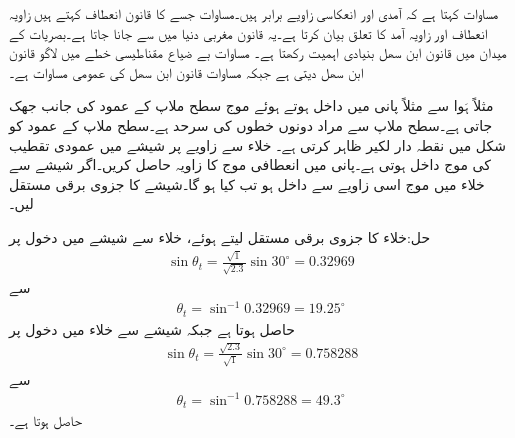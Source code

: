 مساوات  کہتا ہے کہ آمدی اور انعکاسی زاویے برابر ہیں۔مساوات  جسے  کا قانون انعطاف  کہتے ہیں زاویہ انعطاف اور زاویہ آمد کا تعلق بیان کرتا ہے۔یہ قانون مغربی دنیا میں  سے جانا جاتا ہے۔بصریات کے میدان میں قانون ابن سھل بنیادی اہمیت رکھتا ہے۔ مساوات  بے ضیاع مقناطیسی خطے میں لاگو قانون ابن سھل دیتی ہے جبکہ مساوات  قانون ابن سھل کی عمومی مساوات ہے۔

 مثلاً ہَوا سے  مثلاً پانی میں داخل ہوتے ہوئے موج سطح ملاپ کے عمود کی جانب جھک جاتی ہے۔سطح ملاپ سے مراد دونوں خطوں کی سرحد ہے۔سطح ملاپ کے عمود کو شکل  میں نقطہ دار لکیر ظاہر کرتی ہے۔
خلاء سے  زاویے پر شیشے میں عمودی تقطیب کی موج داخل ہوتی ہے۔پانی میں انعطافی موج کا زاویہ  حاصل کریں۔اگر شیشے سے خلاء میں موج اسی زاویے سے داخل ہو تب  کیا ہو گا۔شیشے کا جزوی برقی مستقل  لیں۔

حل:خلاء کا جزوی برقی مستقل  لیتے ہوئے، خلاء سے شیشے میں دخول پر
\begin{align*}
\sin \theta_t = \frac{\sqrt{1}}{\sqrt{2.3}} \sin 30^\circ= 0.32969
\end{align*}
سے
\begin{align*}
\theta_t =\sin^{-1} 0.32969=19.25^\circ
\end{align*}
حاصل ہوتا ہے جبکہ شیشے سے خلاء میں دخول پر
\begin{align*}
\sin \theta_t = \frac{\sqrt{2.3}}{\sqrt{1}} \sin 30^\circ= 0.758288
\end{align*}
سے
\begin{align*}
\theta_t =\sin^{-1} 0.758288=49.3^\circ
\end{align*}
حاصل ہوتا ہے۔

